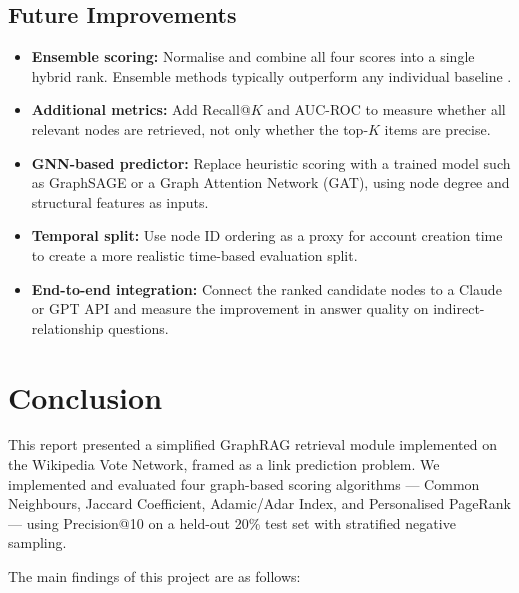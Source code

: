 \documentclass[10pt]{article}
\begin{document}
\subsection{Future Improvements}

\begin{itemize}
  \item \textbf{Ensemble scoring:} Normalise and combine all four scores into a single hybrid rank. Ensemble methods typically outperform any individual baseline \cite{libennowell2003}.
  \item \textbf{Additional metrics:} Add Recall@$K$ and AUC-ROC to measure whether all relevant nodes are retrieved, not only whether the top-$K$ items are precise.
  \item \textbf{GNN-based predictor:} Replace heuristic scoring with a trained model such as GraphSAGE or a Graph Attention Network (GAT), using node degree and structural features as inputs.
  \item \textbf{Temporal split:} Use node ID ordering as a proxy for account creation time to create a more realistic time-based evaluation split.
  \item \textbf{End-to-end integration:} Connect the ranked candidate nodes to a Claude or GPT API and measure the improvement in answer quality on indirect-relationship questions.
\end{itemize}

\section{Conclusion}
\label{sec:conclusion}

This report presented a simplified GraphRAG retrieval module implemented on the Wikipedia Vote Network, framed as a link prediction problem. We implemented and evaluated four graph-based scoring algorithms --- Common Neighbours, Jaccard Coefficient, Adamic/Adar Index, and Personalised PageRank --- using Precision@10 on a held-out 20\% test set with stratified negative sampling.

The main findings of this project are as follows:
\end{document}
